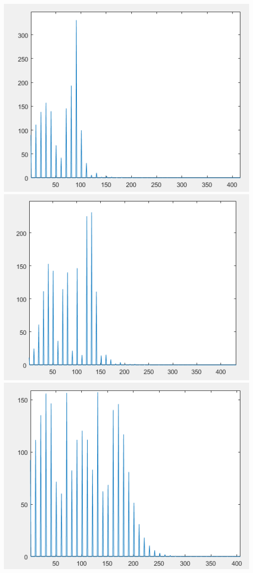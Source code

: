\documentclass[12pt]{article}
\begin{document}
\begin{flushleft}
\begin{center}
    \includegraphics[scale = 0.75]{_045.PNG}\\[1.0 cm]
    \includegraphics[scale = 0.75]{_065.PNG}\\[1.0 cm]
    \includegraphics[scale = 0.75]{_095.PNG}\\[1.0 cm]
    
\end{center}
\end{flushleft}
\end{document}
